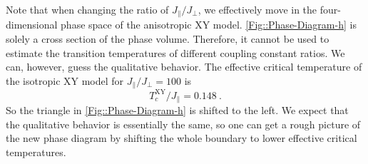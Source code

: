 	
	Note that when changing the ratio of $J_\parallel /	J_\perp$, we effectively move in the four-dimensional phase space of the anisotropic XY model. \def\figureautorefname{Figure}\autoref{Fig::Phase-Diagram-h}\def\figureautorefname{Fig.} is solely a cross section of the phase volume. Therefore, it cannot be used to estimate the transition temperatures of different coupling constant ratios. We can, however, guess the qualitative behavior. The effective critical temperature of the isotropic XY model for $J_\parallel /	J_\perp = 100$ is
	\begin{equation}
		T_c^{\text{XY}} /	J_\parallel =	0.148~.
	\end{equation}
	So the triangle in \autoref{Fig::Phase-Diagram-h} is shifted to the left. We expect that the qualitative behavior is essentially the same, so one can get a rough picture of the new phase diagram by shifting the whole boundary to lower effective critical temperatures.
	
